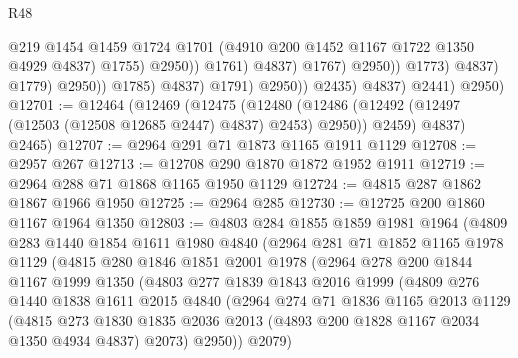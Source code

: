 \begin{lexlean}{R48}
\begin{coremodule}
                                                @219
                                                @1454
                                                @1459
                                                @1724
                                                @1701
                                                (@4910 @200 @1452 @1167 @1722 @1350 @4929 @4837)
                                                @1755)
                                              @2950))
                                          @1761)
                                        @4837)
                                      @1767)
                                    @2950))
                                @1773)
                              @4837)
                            @1779)
                          @2950))
                      @1785)
                    @4837)
                  @1791)
                @2950))
            @2435)
          @4837)
        @2441)
      @2950)
@12701 := @12464
    (@12469
      (@12475
        (@12480 (@12486 (@12492 (@12497 (@12503 (@12508 @12685 @2447) @4837) @2453) @2950)) @2459)
        @4837)
      @2465)
@12707 := @2964 @291 @71 @1873 @1165 @1911 @1129
@12708 := @2957 @267
@12713 := @12708 @290 @1870 @1872 @1952 @1911
@12719 := @2964 @288 @71 @1868 @1165 @1950 @1129
@12724 := @4815 @287 @1862 @1867 @1966 @1950
@12725 := @2964 @285
@12730 := @12725 @200 @1860 @1167 @1964 @1350
@12803 := @4803
    @284
    @1855
    @1859
    @1981
    @1964
    (@4809
      @283
      @1440
      @1854
      @1611
      @1980
      @4840
      (@2964
        @281
        @71
        @1852
        @1165
        @1978
        @1129
        (@4815
          @280
          @1846
          @1851
          @2001
          @1978
          (@2964
            @278
            @200
            @1844
            @1167
            @1999
            @1350
            (@4803
              @277
              @1839
              @1843
              @2016
              @1999
              (@4809
                @276
                @1440
                @1838
                @1611
                @2015
                @4840
                (@2964
                  @274
                  @71
                  @1836
                  @1165
                  @2013
                  @1129
                  (@4815
                    @273
                    @1830
                    @1835
                    @2036
                    @2013
                    (@4893 @200 @1828 @1167 @2034 @1350 @4934 @4837)
                    @2073)
                  @2950))
              @2079)

\end{coremodule}
\end{lexlean}
